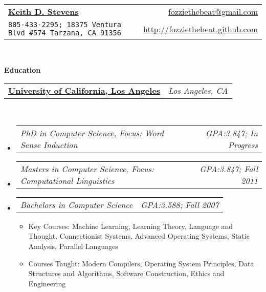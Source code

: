 \documentclass[letterpaper,11pt]{article}
\makeatletter
\newcommand{\resitem}[1]{\item #1 \vspace{-2pt}}
\newcommand{\resheading}[1]{{\large \colorbox{mygrey}{\begin{minipage}{\textwidth}{\textbf{#1 \vphantom{p\^{E}}}}\end{minipage}}}}
\newcommand{\multiHeading}[2]{
\begin{tabular*}{6.5in}{l@{\extracolsep{\fill}}r}
  \textbf{#1} & \textit{#2} \\
\end{tabular*}\vspace{-6pt}}
\newcommand{\multiPart}[2]{
\begin{tabular*}{6.5in}{l@{\extracolsep{\fill}}r}
  \textit{#1} & \textit{#2} \\
\end{tabular*}\vspace{-6pt}}
\makeatother
\begin{document}
\newcommand{\mywebheader}{
\begin{tabular*}{7in}{l@{\extracolsep{\fill}}r}
	\textbf{\href{http://kracken.cs.ucla.edu/}{\LARGE Keith D. Stevens}} & \href{mailto:fozziethebeat@gmail.com}{fozziethebeat@gmail.com}\\
	{\footnotesize \texttt{805-433-2295; 18375 Ventura Blvd \#574 Tarzana, CA 91356}} & \href{http://fozziethebeat.github.com}{http://fozziethebeat.github.com} \\
    \end{tabular*}
\\
\vspace{0.1in}}

\mywebheader

\resheading{Education}
  \multiHeading{\href{http://www.ucla.edu}{University of California, Los Angeles}}
               {Los Angeles, CA}  \\
  \begin{itemize}
    \item \multiPart{PhD in Computer Science, Focus: Word Sense Induction}{GPA:3.847; In Progress}
    \item \multiPart{Masters in Computer Science, Focus: Computational
    Linguistics}{GPA:3.847; Fall 2011}
    \item \multiPart{Bachelors in Computer Science}{GPA:3.588; Fall 2007}
    { \footnotesize
    \begin{itemize}
      \resitem{Key Courses: Machine Learning, Learning Theory, Language and
      Thought, Connectionist Systems, Advanced Operating Systems, Static
      Analysis, Parallel Languages}
      \resitem{Courses Taught: Modern Compilers, Operating System Principles, Data
      Structures and Algorithms, Software Construction, Ethics and Engineering}
    \end{itemize}
    }
  \end{itemize} %
\end{document}
